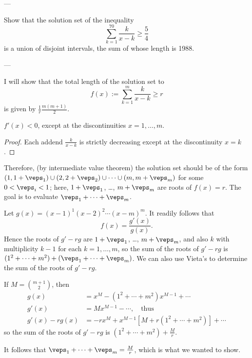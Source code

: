 
---

Show that the solution set of the inequality
\[\sum^{70}_{k=1}\frac k{x-k}\ge\frac54\]
is a union of disjoint intervals, the sum of whose length is 1988.

---

I will show that the total length of the solution set to
\[f(x):=\sum_{k=1}^m\frac k{x-k}\ge r\]
is given by $\frac1r\frac{m(m+1)}2$.
\begin{claim*}
    $f'(x)<0$, except at the discontinuities $x=1,\ldots,m$.
\end{claim*}
\begin{proof}
    Each addend $\frac k{x-k}$ is strictly decreasing except at the discontinuity $x=k$.
\end{proof}

Therefore, (by intermediate value theorem) the solution set should be of the form $(1,1+\veps_1)\cup(2,2+\veps_2)\cup\cdots\cup(m,m+\veps_m)$ for some $0<\veps_i<1$; here, $1+\veps_1$, \ldots, $m+\veps_m$ are roots of $f(x)=r$. The goal is to evaluate $\veps_1+\cdots+\veps_m$. 

Let $g(x)=(x-1)^1(x-2)^2\cdots(x-m)^m$. It readily follows that
\[f(x)=\frac{g'(x)}{g(x)}.\]
Hence the roots of $g'-rg$ are $1+\veps_1$, \ldots, $m+\veps_m$, and also $k$ with multiplicity $k-1$ for each $k=1,\ldots,m$, so the sum of the roots of $g'-rg$ is $(1^2+\cdots+m^2)+(\veps_1+\cdots+\veps_m)$. We can also use Vieta's to determine the sum of the roots of $g'-rg$.

If $M=\binom{m+1}2$, then
\begin{align*}
    g(x)&=x^M-\left(1^2+\cdots+m^2\right)x^{M-1}+\cdots\\
    g'(x)&=Mx^{M-1}-\cdots,\quad\text{thus}\\
    g'(x)-rg(x)&=-rx^M+x^{M-1}\left[M+r\left(1^2+\cdots+m^2\right)\right]+\cdots
\end{align*}
so the sum of the roots of $g'-rg$ is $(1^2+\cdots+m^2)+\frac Mr$.

It follows that $\veps_1+\cdots+\veps_m=\frac Mr$, which is what we wanted to show.

